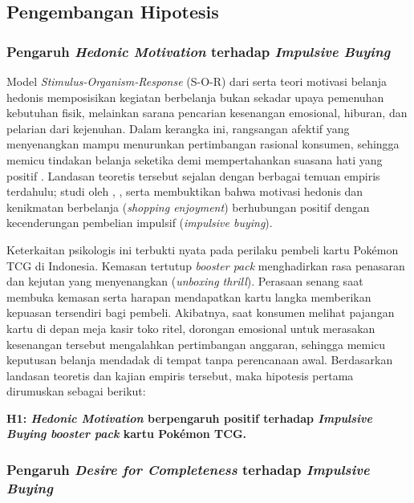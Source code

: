\documentclass[12pt,a4paper]{article}
\numberwithin{equation}{section}
\numberwithin{table}{section}
\numberwithin{figure}{section}
\begin{document}
\subsection{Pengembangan Hipotesis}

\subsubsection{Pengaruh \emph{Hedonic Motivation} terhadap \emph{Impulsive Buying}}

Model \emph{Stimulus-Organism-Response} (S-O-R) dari \citet{huo2023exploring} serta teori motivasi belanja hedonis \citep{widyastuti2024power} memposisikan kegiatan berbelanja bukan sekadar upaya pemenuhan kebutuhan fisik, melainkan sarana pencarian kesenangan emosional, hiburan, dan pelarian dari kejenuhan. Dalam kerangka ini, rangsangan afektif yang menyenangkan mampu menurunkan pertimbangan rasional konsumen, sehingga memicu tindakan belanja seketika demi mempertahankan suasana hati yang positif \citep{babin1994work}. Landasan teoretis tersebut sejalan dengan berbagai temuan empiris terdahulu; studi oleh \citet{pranggabayu2022pengaruh}, \citet{azizah2025exploring}, serta \citet{artadita2024how} membuktikan bahwa motivasi hedonis dan kenikmatan berbelanja (\emph{shopping enjoyment}) berhubungan positif dengan kecenderungan pembelian impulsif (\emph{impulsive buying}).

Keterkaitan psikologis ini terbukti nyata pada perilaku pembeli kartu Pok\'emon TCG di Indonesia. Kemasan tertutup \emph{booster pack} menghadirkan rasa penasaran dan kejutan yang menyenangkan (\emph{unboxing thrill}). Perasaan senang saat membuka kemasan serta harapan mendapatkan kartu langka memberikan kepuasan tersendiri bagi pembeli. Akibatnya, saat konsumen melihat pajangan kartu di depan meja kasir toko ritel, dorongan emosional untuk merasakan kesenangan tersebut mengalahkan pertimbangan anggaran, sehingga memicu keputusan belanja mendadak di tempat tanpa perencanaan awal. Berdasarkan landasan teoretis dan kajian empiris tersebut, maka hipotesis pertama dirumuskan sebagai berikut:

\vspace{0.2cm}
\textbf{H1: \emph{Hedonic Motivation} berpengaruh positif terhadap \emph{Impulsive Buying} \emph{booster pack} kartu Pok\'emon TCG.}

\subsubsection{Pengaruh \emph{Desire for Completeness} terhadap \emph{Impulsive Buying}}
\end{document}
